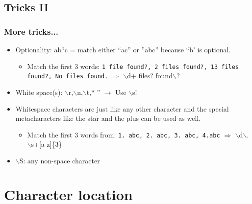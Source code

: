 \documentclass[xcolor=x11names,compress]{beamer}
\renewcommand{\(}{\begin{columns}}
\renewcommand{\)}{\end{columns}}
\newcommand{\<}[1]{\begin{column}{#1}}
\renewcommand{\>}{\end{column}}
\begin{document}
\subsection{Tricks II}
\begin{frame}[fragile]
\frametitle{More tricks...}
	\begin{itemize}
		\item Optionality: ab?c = match either ``ac'' or ''abc'' because ``b' is optional.
		\begin{itemize}
			\item Match the first 3 words: \texttt{1 file found?, 2 files found?, 13 files found?, No files found.} \pause $\Rightarrow$ $\backslash$d+ files? found$\backslash$?
		\end{itemize}
		\item White space(s): $\backslash$r,$\backslash$n,$\backslash$t,`` '' $\rightarrow$ Use $\backslash$s!
		\item Whitespace characters are just like any other character and the special metacharacters like the star and the plus can be used as well.
		\begin{itemize}
			\item Match the first 3 words from: \texttt{1. abc, 2.   abc, 3.      abc, 4.abc} \pause $\Rightarrow$ $\backslash$d$\backslash$.$\backslash$s+[a-z]\{3\}
		\end{itemize}
		\item $\backslash$S: any non-space character
	\end{itemize}
\end{frame}

\section{Character location}
\end{document}
